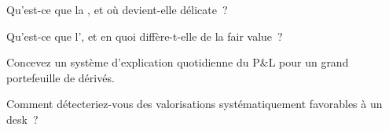 \begin{interviewq}\label{iq:rc:pnl-explain-and-independent-price-verification:3}
Qu'est-ce que la , et où devient-elle délicate~?
\end{interviewq}

\begin{interviewq}\label{iq:rc:pnl-explain-and-independent-price-verification:4}
Qu'est-ce que l', et en quoi diffère-t-elle de la fair value~?
\end{interviewq}

\begin{interviewq}\label{iq:rc:pnl-explain-and-independent-price-verification:5}
Concevez un système d'explication quotidienne du P\&L pour un grand portefeuille de dérivés.
\end{interviewq}

\begin{interviewq}\label{iq:rc:pnl-explain-and-independent-price-verification:6}
Comment détecteriez-vous des valorisations systématiquement favorables à un desk~?
\end{interviewq}

